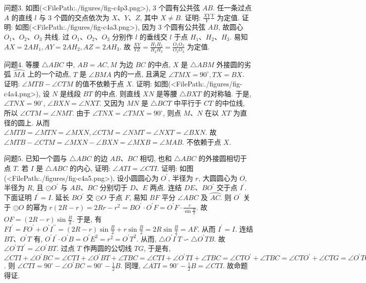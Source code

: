 问题3. 如图(<FilePath:./figures/fig-c4p3.png>), 3 个圆有公共弦 $A B$. 任一条过点 $A$ 的直线 $l$ 与 3 个圆的交点依次为 $X 、 Y 、 Z$, 其中 $X \neq B$. 证明: $\frac{X Y}{Y} \frac{Y}{}$ 为定值.
证明: 如图(<FilePath:./figures/fig-c4a3.png>), 因为 3 个圆有公共弦 $A B$, 故圆心 $O_1 、 O_2 、 O_3$ 共线.
过 $O_1 、 O_2 、 O_3$ 分别作 $l$ 的垂线交 $l$ 于点 $H_1 、 H_2 、 H_3$. 易知 $A X=2 A H_1, A Y= 2 A H_2, A Z=2 A H_3$.
故 $\frac{X Y}{Y Z}=\frac{H_1 H_2}{H_2 H_3}=\frac{O_1 O_2}{O_2 O_3}$ 为定值.



问题4. 等腰 $\triangle A B C$ 中, $A B=A C, M$ 为边 $B C$ 的中点, $X$ 是 $\triangle A B M$ 外接圆的劣弧 $\overparen{M A}$ 上的一个动点, $T$ 是 $\angle B M A$ 内的一点, 且满足 $\angle T M X=90^{\circ}, T X=B X$. 证明: $\angle M T B-\angle C T M$ 的值不依赖于点 $X$.
证明: 如图(<FilePath:./figures/fig-c4a4.png>), 设 $N$ 是线段 $B T$ 的中点.
则直线 $X N$ 是等腰 $\triangle B X T$ 的对称轴.
于是, $\angle T N X=90^{\circ}$, $\angle B X N=\angle N X T$. 又因为 $M N$ 是 $\triangle B C T$ 中平行于 $C T$ 的中位线, 所以 $\angle C T M=\angle N M T$. 由于 $\angle T N X= \angle T M X=90^{\circ}$, 则点 $M 、 N$ 在以 $X T$ 为直径的圆上.
从而
$\angle M T B=\angle M T N=\angle M X N, \angle C T M=\angle N M T=\angle N X T=\angle B X N$. 故 $\angle M T B-\angle C T M=\angle M X N-\angle B X N=\angle M X B=\angle M A B$. 不依赖于点 $X$.



问题5. 已知一个圆与 $\triangle A B C$ 的边 $A B 、 B C$ 相切, 也和 $\triangle A B C$ 的外接圆相切于点 $T$. 若 $I$ 是 $\triangle A B C$ 的内心, 证明: $\angle A T I=\angle C T I$.
证明: 如图(<FilePath:./figures/fig-c4a5.png>), 设小圆圆心为 $O^{\prime}$, 半径为 $r$, 大圆圆心为 $O$, 半径为 $R$, 且 $\odot O^{\prime}$ 与 $A B 、 B C$ 分别切于 $D 、 E$ 两点.
连结 $D E 、 B O^{\prime}$ 交于点 $I^{\prime}$.
下面证明 $I^{\prime}=I$. 延长 $B O^{\prime}$ 交 $\odot O$ 于点 $F$, 易知 $B F$ 平分 $\angle A B C$ 及 $\overparen{A C}$. 则 $O^{\prime}$ 关于 $\odot O$ 的幂为 $r(2 R-r)= 2 R r-r^2=B O^{\prime} \cdot O^{\prime} F=O^{\prime} F \cdot \frac{r}{\sin \frac{B}{2}}$. 故 $O F=(2 R-r) \sin \frac{B}{2}$. 于是, 有 $F I^{\prime}=F O^{\prime}+O^{\prime} I^{\prime \prime}=(2 R-r) \sin \frac{B}{2}+ r \sin \frac{B}{2}=2 R \sin \frac{B}{2}=A F$. 从而 $I^{\prime}=I$.
连结 $B T 、 O^{\prime} T$ 有, $O^{\prime} I^{\prime} \cdot O^{\prime} B=O^{\prime} E^2=r^2=O^{\prime} T^2$. 从而, $\triangle O^{\prime} I^{\prime} T \backsim \triangle O^{\prime} T B$. 故 $\angle O^{\prime} T I^{\prime}=\angle O^{\prime} B T$. 过点 $T$ 作两圆的公切线 $T G$, 于是有, $\angle C T I+\angle O^{\prime} B C=\angle C T I+\angle O^{\prime} B T+\angle T B C=\angle C T I+\angle O^{\prime} T I+ \angle T B C=\angle C T O^{\prime}+\angle T B C=\angle C T O^{\prime}+\angle C T G=\angle O^{\prime} T G=90^{\circ}$. 则 $\angle C T I=90^{\circ}-\angle O^{\prime} B C=90^{\circ}-\frac{1}{2} B$. 同理, $\angle A T I=90^{\circ}-\frac{1}{2} B=\angle C T I$.
故命题得证.



